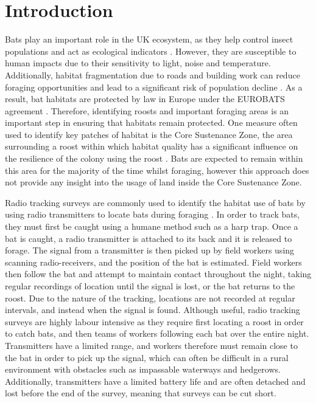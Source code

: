 \section{Introduction}

  Bats play an important role in the UK ecosystem, as they help control insect
  populations \cite{Kunz2011} and act as ecological indicators \cite{Jones2009}.
  However, they are susceptible to human impacts due to their sensitivity to
  light, noise and temperature. Additionally, habitat fragmentation due to roads
  and building work can reduce foraging opportunities and lead to a significant
  risk of population decline \cite{rossiter2000genetic}.
 As a result, bat habitats are protected by law in
Europe under the EUROBATS agreement \cite{Eurobats}. Therefore, identifying
roosts and important foraging areas is an important step in ensuring that
habitats remain protected. One measure often used to identify key patches of
habitat is the Core Sustenance Zone, the area surrounding a roost within which
habitat quality has a significant influence on the resilience of the colony
using the roost \cite{CSZ}. Bats are expected to remain within this area for
the majority of the time whilst foraging, however this approach does not provide
any insight into the usage of land inside the Core Sustenance Zone.

  Radio tracking surveys are commonly used to identify the habitat use of bats
   by using radio transmitters to
 locate bats during foraging
   \cite{Bontadina2002,
Encarnacao2005}.
  In order to
 track bats, they must first be caught using a
humane method such as a harp trap.
 Once a bat is caught, a radio
   transmitter
is attached to its back and it is
 released to forage. The
  signal from a
transmitter is then picked up by field
 workers using scanning radio-receivers, and the position of the bat is
 estimated. Field workers then follow the bat and attempt to maintain contact
 throughout the night, taking regular recordings of location until the signal is
 lost, or the bat returns to
the roost. Due to the nature of the tracking,
 locations are not recorded at regular intervals, and instead when the signal is
 found. Although useful, radio
tracking surveys are highly labour intensive as
 they require first locating a
roost in order to catch bats, and then teams of
 workers following each bat over the entire night. Transmitters have a limited
 range, and workers therefore
must remain close to the bat in order to pick up
 the signal, which can often be
difficult in a rural environment with obstacles
 such as impassable waterways
and hedgerows. Additionally,
  transmitters have a
 limited battery life and are
often detached and lost before the end of the
 survey, meaning that surveys can
be cut short.

